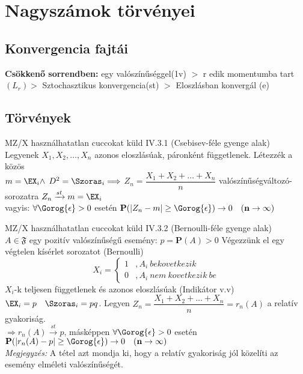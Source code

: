 \section{Nagyszámok törvényei}

\subsection{Konvergencia fajtái}

	\textbf{Csökkenő sorrendben:} egy valószínűséggel(1v) $>$ r edik momentumba tart $(L_r) >$ Sztochasztikus konvergencia(st) $>$ Eloszlásban konvergál (e)

\subsection{Törvények}
\begin{tetel}{MZ/X használhatatlan cuccokat küld}
	IV.3.1 (Csebisev-féle gyenge alak)\\[2pt]
		\forceindent Legyenek $X_1,X_2,\ldots,X_n$ azonos eloszlásúak, páronként függetlenek. Létezzék a közös\\[1pt] $m = \EX_i \land$  $D^2 = \Szoras_i \Longrightarrow$  $Z_n = \dfrac{X_1+X_2+\ldots+X_n}{n}$ valószínűségváltozó-sorozatra $Z_n \xrightarrow{st} m = \EX_i$\\[2pt]
		vagyis: $\forall \Gorog{\epsilon} > 0$ esetén $\textbf{P}(|Z_n-m| \geq \Gorog{\epsilon}) \rightarrow 0 \quad \mathbf{(n \rightarrow \infty )} $\\[3pt]
\end{tetel}
    \begin{tetel}{MZ/X használhatatlan cuccokat küld}
	IV.3.2 (Bernoulli-féle gyenge alak)\\[2pt]
	\forceindent $A \in \mathfrak{F}$ egy pozitív valószínűségű esemény: $p = \mathbf{P}(A) > 0$ Végezzünk el egy végtelen kísérlet sorozatot (Bernoulli)
	\[ X_i =  \begin{cases}
      1 & ,A_i\ bekovetkezik \\
      0 & ,A_i\ nem\ kovetkezik\ be
   \end{cases} \]
$X_i$-k teljesen függetlenek és azonos eloszlásúak (Indikátor v.v)\\[2pt]
$\EX_i = p \quad \Szoras_i = pq$. Legyen $Z_n = \dfrac{X_1+X_2+\ldots+X_n}{n} = r_n(A)$ a relatív gyakoriság.\\[2pt]
$\Longrightarrow r_n(A) \xrightarrow{st} p$,\quad
másképpen $\forall \Gorog{\epsilon} > 0$ esetén $\textbf{P}(|r_n(A)-p| \geq \Gorog{\epsilon}) \rightarrow 0 \quad \mathbf{(n \rightarrow \infty )}$\\[3pt]
\small \textit{Megjegyzés:} A tétel azt mondja ki, hogy a relatív gyakoriság jól közelíti az esemény elméleti valószínűségét. \normalsize \\[3pt]
\end{tetel}
